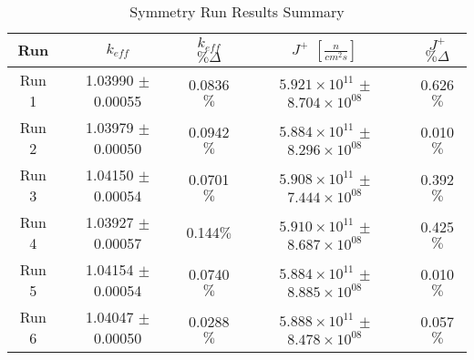 
\begin{table}[H]
\centering
\caption{Symmetry Run Results Summary}
 \begin{tabularx}{0.7\textwidth}{c  c  c  c  c}
 	\hline
 	Run & $k_{eff}$ & $k_{eff}$ $\% \Delta$ & $J^+$  $[\frac{n}{cm^2s}]$ & $J^+$ $\% \Delta$  \\
 	\hline
 	Run 1 & 1.03990 $\pm$ 0.00055 & 0.0836$\%$ & $5.921\times10^{11}$ $\pm$ $8.704\times10^{08}$ & 0.626$\%$ \\
 	Run 2 & 1.03979 $\pm$ 0.00050 & 0.0942$\%$ & $5.884\times10^{11}$ $\pm$ $8.296\times10^{08}$ & 0.010$\%$ \\
 	Run 3 & 1.04150 $\pm$ 0.00054 & 0.0701$\%$ & $5.908\times10^{11}$ $\pm$ $7.444\times10^{08}$ & 0.392$\%$ \\
 	Run 4 & 1.03927 $\pm$ 0.00057 & 0.144$\%$ & $5.910\times10^{11}$ $\pm$ $8.687\times10^{08}$ & 0.425$\%$ \\
 	Run 5 & 1.04154 $\pm$ 0.00054 & 0.0740$\%$ & $5.884\times10^{11}$ $\pm$ $8.885\times10^{08}$ & 0.010$\%$ \\
 	Run 6 & 1.04047 $\pm$ 0.00050 & 0.0288$\%$ & $5.888\times10^{11}$ $\pm$ $8.478\times10^{08}$ & 0.057$\%$ \\
 	\hline

 \end{tabularx}
\label{table:slicesens}
\end{table}